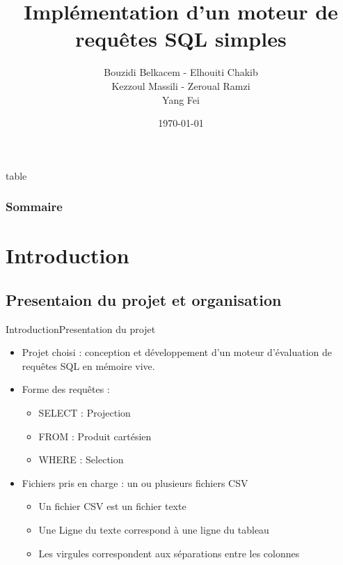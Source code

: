 \documentclass[10pt,handout]{beamer}
\title[Moteur de requêtes SQL]{Implémentation d’un moteur de \\ requêtes SQL simples}
\author[Bouzidi, Elhouiti, Kezzoul, Zeroual, Yang]{Bouzidi Belkacem - Elhouiti Chakib \\ Kezzoul Massili - Zeroual Ramzi \\ Yang Fei}
\institute[]{Université de Montpellier}
\date{\today}
\newif\ifplacelogo %
\begin{document}
\placelogofalse
\begin{frame}
	\titlepage
\end{frame}

\placelogotrue


\begin{frame}{table}
	\frametitle{Sommaire}
	\tableofcontents
\end{frame}

\section{Introduction}

\subsection{Presentaion du projet et organisation}

\begin{frame}{Introduction}{Presentation du projet}
\begin{itemize}
  \item Projet choisi : conception et développement d’un moteur d’évaluation de requêtes SQL en mémoire vive.
  \item Forme des requêtes :
  \begin{itemize}
    \item SELECT : Projection
    \item FROM : Produit cartésien
    \item WHERE : Selection
  \end{itemize}
  \item Fichiers pris en charge : un ou plusieurs fichiers CSV
  \begin{itemize}
    \item Un fichier CSV est un fichier texte
    \item Une Ligne du texte correspond à une ligne du tableau
    \item Les virgules correspondent aux séparations entre les colonnes
  \end{itemize}
\end{itemize}
\end{frame}
\end{document}

